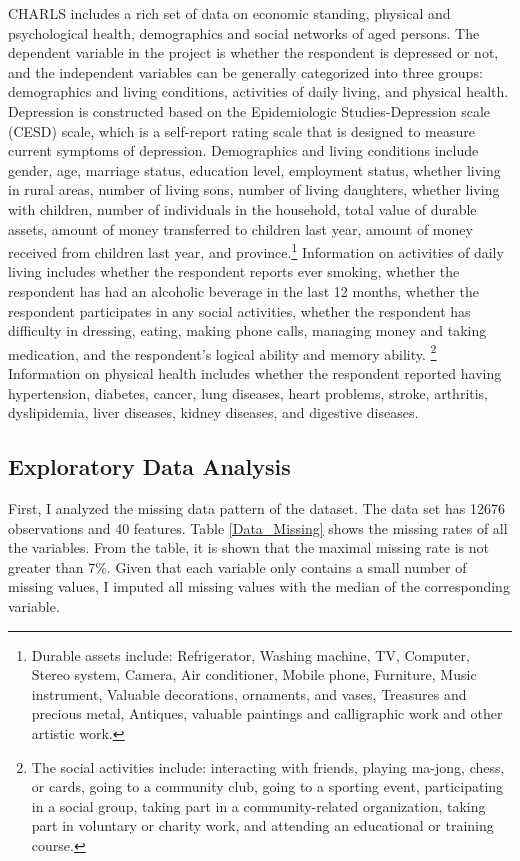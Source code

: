 \documentclass[12pt]{article}
\begin{document}
\par CHARLS includes a rich set of data on economic standing, physical and psychological health, demographics and social networks of aged persons. The dependent variable in the project is whether the respondent is depressed or not, and the independent variables can be generally categorized into three groups: demographics and living conditions, activities of daily living, and physical health. Depression is constructed based on the Epidemiologic Studies-Depression scale (CESD) scale, which is a self-report rating scale that is designed to measure current symptoms of depression. Demographics and living conditions include gender, age, marriage status, education level, employment status, whether living in rural areas, number of living sons, number of living daughters, whether living with children, number of individuals in the household, total value of durable assets, amount of money transferred to children last year, amount of money received from children last year, and province.\footnote {Durable assets include: Refrigerator, Washing machine, TV, Computer, Stereo system, Camera, Air conditioner, Mobile phone, Furniture,  Music instrument,  Valuable decorations, ornaments, and vases,  Treasures and precious metal,  Antiques, valuable paintings and calligraphic work and other artistic work.} Information on activities of daily living includes whether the respondent reports ever smoking, whether the respondent has had an alcoholic beverage in the last 12 months, whether the respondent participates in any social activities, whether the respondent has difficulty in dressing, eating, making phone calls, managing money and taking medication, and the respondent’s logical ability and memory ability. \footnote { The social activities include: interacting with friends, playing ma-jong, chess, or cards, going to a community club, going to a sporting event, participating in a social group, taking part in a community-related organization, taking part in voluntary or charity work, and attending an educational or training course.} Information on physical health includes whether the respondent reported having hypertension, diabetes, cancer, lung diseases, heart problems, stroke, arthritis, dyslipidemia, liver diseases, kidney diseases, and digestive diseases.


\subsection{Exploratory Data Analysis}
First, I analyzed the missing data pattern of the dataset. The data set has 12676 observations and 40 features. Table \ref{Data_Missing} shows the missing rates of all the variables. From the table, it is shown that the maximal missing rate is not greater than 7\%. Given that each variable only contains a small number of missing values, I imputed all missing values with the median of the corresponding variable.
\end{document}
